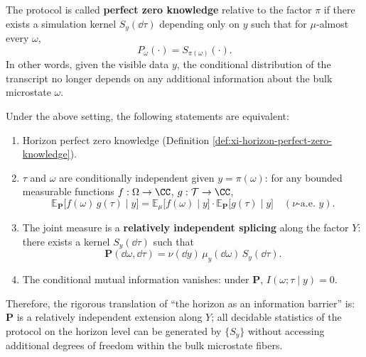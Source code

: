 \begin{definition}\label{def:xi-horizon-perfect-zero-knowledge}
The protocol is called \textbf{perfect zero knowledge} relative to the factor \(\pi\) if there exists a simulation kernel \(S_y(\dd\tau)\) depending only on \(y\) such that for \(\mu\)-almost every \(\omega\),
\[
P_{\omega}(\cdot)=S_{\pi(\omega)}(\cdot).
\]
In other words, given the visible data \(y\), the conditional distribution of the transcript no longer depends on any additional information about the bulk microstate \(\omega\).
\end{definition}

\begin{theorem}\label{thm:xi-horizon-perfect-zk-equivalences}
Under the above setting, the following statements are equivalent:
\begin{enumerate}
  \item Horizon perfect zero knowledge (Definition \ref{def:xi-horizon-perfect-zero-knowledge}).
  \item \(\tau\) and \(\omega\) are conditionally independent given \(y=\pi(\omega)\): for any bounded measurable functions \(f:\Omega\to\CC\), \(g:\mathcal{T}\to\CC\),
  \[
  \mathbb{E}_{\mathbf{P}}\bigl[f(\omega)\,g(\tau)\mid y\bigr]
  =
  \mathbb{E}_{\mu}\bigl[f(\omega)\mid y\bigr]\cdot
  \mathbb{E}_{\mathbf{P}}\bigl[g(\tau)\mid y\bigr]
  \quad(\nu\text{-a.e. }y).
  \]
  \item The joint measure is a \textbf{relatively independent splicing} along the factor \(Y\): there exists a kernel \(S_y(\dd\tau)\) such that
  \[
  \mathbf{P}(\dd\omega,\dd\tau)
  =
  \nu(\dd y)\,\mu_y(\dd\omega)\,S_y(\dd\tau).
  \]
  \item The conditional mutual information vanishes: under \(\mathbf{P}\), \(I(\omega;\tau\mid y)=0\).
\end{enumerate}
Therefore, the rigorous translation of ``the horizon as an information barrier'' is: \(\mathbf{P}\) is a relatively independent extension along \(Y\); all decidable statistics of the protocol on the horizon level can be generated by \(\{S_y\}\) without accessing additional degrees of freedom within the bulk microstate fibers.
\end{theorem}

